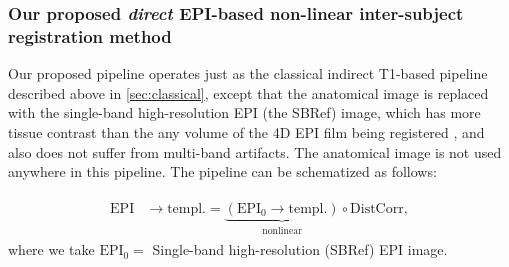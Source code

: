 


\subsubsection{Our proposed \textit{direct} EPI-based non-linear  inter-subject
  registration method}
\label{sec:proposed}
Our proposed pipeline operates just as the
classical indirect T1-based pipeline described above in
\ref{sec:classical}, except that the anatomical image is replaced with
the single-band high-resolution EPI (the SBRef) image, which has more tissue contrast than the any volume of the 4D EPI film being registered
\citep{glasser2013}, and also does not suffer from multi-band artifacts. The anatomical image is not used anywhere in
this pipeline.  The pipeline can be schematized as follows:

\begin{eqnarray}
  \begin{split}
    \text{EPI} &\rightarrow \text{templ.}
    = \underbrace{(\text{EPI}_0 \rightarrow \text{templ.})}_{\text{nonlinear}} \circ  \text{DistCorr},
    \label{eq:dcsbref_pl}
    \end{split}
\end{eqnarray}
where we take $\text{EPI}_0 = $ Single-band high-resolution (SBRef) EPI image.

